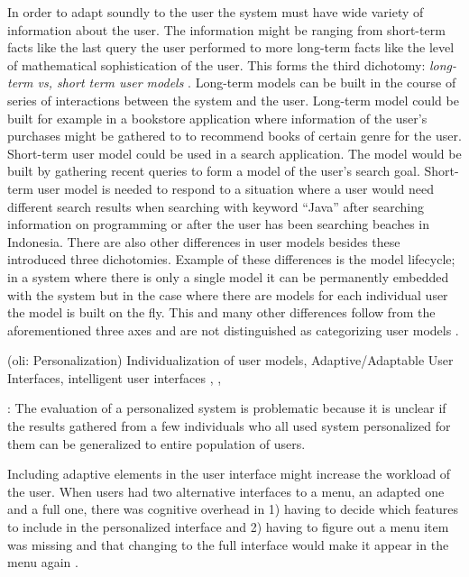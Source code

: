 \documentclass{sigchi}
\begin{document}
In order to adapt soundly to the user the system must have wide variety of information about the user. The information might be ranging from short-term facts like the last query the user performed to more long-term facts like the level of mathematical sophistication of the user. This forms the third dichotomy: \textit{long-term vs, short term user models} \cite{rich99}. Long-term models can be built in the course of series of interactions between the system and the user. Long-term model could be built for example in a bookstore application where information of the user's purchases might be gathered to to recommend books of certain genre for the user. Short-term user model could be used in a search application. The model would be built by gathering recent queries to form a model of the user's search goal. Short-term user model is needed to respond to a situation where a user would need different search results when searching with keyword “Java” after searching information on programming or after the user has been searching beaches in Indonesia. There are also other differences in user models besides these introduced three dichotomies. Example of these differences is the model lifecycle; in a system where there is only a single model it can be permanently embedded with the system but in the case where there are models for each individual user the model is built on the fly. This and many other differences follow from the aforementioned three axes and are not distinguished as categorizing user models \cite{rich99}. 



 

(oli: Personalization)
Individualization of user models, Adaptive/Adaptable User Interfaces, intelligent user interfaces
\cite{bunt04}, \cite{findlater04}, \cite{brusi96}

\cite{van08}: The evaluation of a personalized system is problematic because it is unclear if the results gathered from a few individuals who all used system personalized for them can be generalized to entire population of users.

Including adaptive elements in the user interface might increase the workload of the user. When users had two alternative interfaces to a menu, an adapted one and a full one, there was cognitive overhead in 1) having to decide which features to include in the personalized interface and 2) having to figure out a menu item was missing and that changing to the full interface would make it appear in the menu again \cite{bunt04}.
\end{document}
